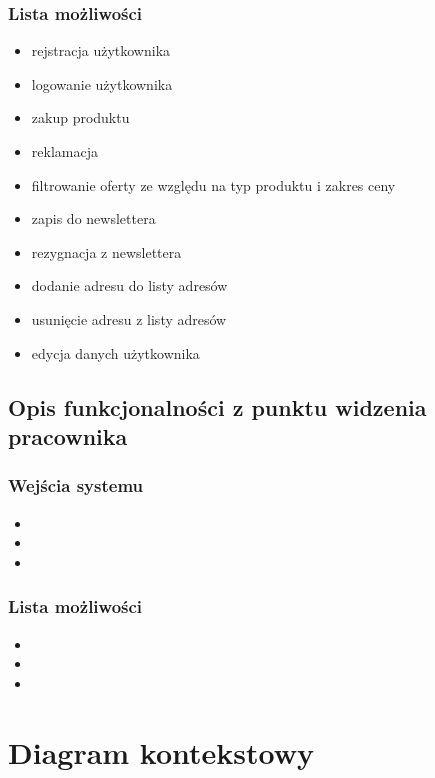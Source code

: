 \documentclass[12pt]{report}
\begin{document}
	
	\subsection{Lista możliwości}
		\begin{itemize}
			\item rejstracja użytkownika
			\item logowanie użytkownika
			\item zakup produktu
			\item reklamacja
			\item filtrowanie oferty ze względu na typ produktu i zakres ceny
			\item zapis do newslettera
			\item rezygnacja z newslettera
			\item dodanie adresu do listy adresów
			\item usunięcie adresu z listy adresów
			\item edycja danych użytkownika
		\end{itemize}


	\section{Opis funkcjonalności z punktu widzenia pracownika}

	\subsection{Wejścia systemu}
		\begin{itemize}
			\item 
			\item 
			\item
		\end{itemize}
	
	
	\subsection{Lista możliwości}
	\begin{itemize}
		\item 
		\item 
		\item
	\end{itemize}

	\chapter{Diagram kontekstowy}
\end{document}
